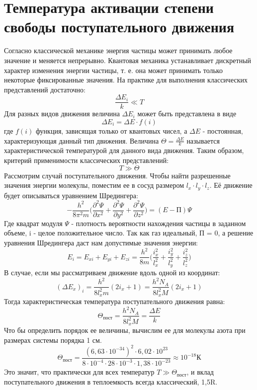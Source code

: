 \documentclass{article}
\begin{document}
\section{Температура активации степени свободы поступательного движения}
Согласно классической механике энергия частицы может принимать любое значение и меняется непрерывно. Квантовая механика устанавливает дискретный характер изменения энергии частицы, т. е. она может принимать только некоторые фиксированные значения. На практике для выполнения классических представлений достаточно: 
   \begin{equation*}
\frac{\Delta E_i}{k} \ll T
  \end{equation*} 
 Для разных видов движения величина $\Delta E_i$ может быть представлена в виде 
    \begin{equation*}
\Delta E_i = \Delta E \cdot f(i)
  \end{equation*} 
  где $f(i)$ функция, зависящая только от квантовых чисел, а $\Delta E$ - постоянная, характеризующая данный тип движения.
  Величина $\Theta = \frac{\Delta E}{k}$ называется характеристической температурой для данного вида движения. Таким образом, критерий применимости классических представлений:
      \begin{equation*}
T \gg \Theta
  \end{equation*} 
Рассмотрим случай поступательного движения. Чтобы найти разрешенные значения энергии молекулы, поместим ее в сосуд размером $l_x \cdot l_y \cdot l_z$.
Её движение будет описываться уравнением Шредингера:
      \begin{equation*}
-\frac{h^2}{8 \pi^2m}\big(\frac{\partial^2 \Psi}{\partial x^2}+\frac{\partial^2 \Psi}{\partial y^2}+\frac{\partial^2 \Psi}{\partial z^2}\big) = (E - П)\Psi
  \end{equation*} 
  Где квадрат модуля $\Psi$ - плотность вероятности нахождения частицы в заданном объеме, i - целое положительное число. Так как газ идеальный, П = 0, а решение уравнения Шредингера даст нам допустимые значения энергии:
        \begin{equation*}
E_i = E_{xi} + E_{yi} + E_{zi}=\frac{h^2}{8m}\big(\frac{i_x^2}{l_x^2}+\frac{i_y^2}{l_y^2}+\frac{i_z^2}{l_z^2}\big)
  \end{equation*} 
  В случае, если мы рассматриваем движение вдоль одной из координат:
\begin{equation*}
(\Delta E_x)_i = \frac{h^2}{8l_x^2m}(2i_x+1) = \frac{h^2N_A}{8l_x^2M}(2i_x+1)
\end{equation*} 
Тогда характеристическая температура поступательного движения равна:
\begin{equation*}
\Theta_{пост} = \frac{h^2N_A}{8l_x^2M} = \frac{\Delta E}{k}
\end{equation*} 
Что бы определить порядок ее величины, вычислим ее для молекулы азота при размерах системы порядка 1 см. 
\begin{equation*}
\Theta_{пост} = \frac{(6,63\cdot 10^{-34})^2 \cdot 6,02 \cdot 10^{23}}{8\cdot 10^{-4}\cdot 28 \cdot 10^{-3}\cdot 1,38 \cdot 10^{-23}} \approx 10^{-18} К
\end{equation*} 
Это значит, что практически для всех температур $T \gg \Theta_{пост}$, и вклад поступательного движения в теплоемкость всегда классический, 1,5R.
\end{document}
